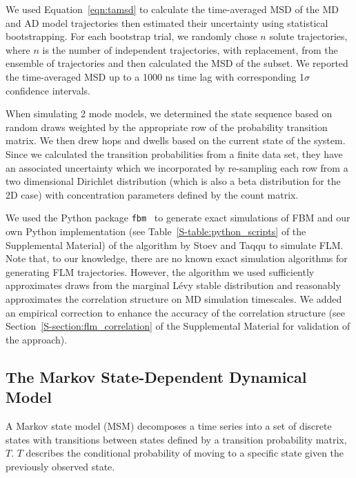 \documentclass[aps,pre,preprint,groupedaddress,longbibliography]{revtex4-2}
\begin{document}
  We used Equation~\ref{eqn:tamsd} to calculate the time-averaged MSD of the MD
  and AD model trajectories then estimated their uncertainty using statistical
  bootstrapping. For each bootstrap trial, we randomly chose $n$ solute
  trajectories, where $n$ is the number of independent trajectories, with
  replacement, from the ensemble of trajectories and then calculated the MSD of
  the subset. We reported the time-averaged MSD up to a 1000 ns time lag with
  corresponding 1$\sigma$ confidence intervals. 

  When simulating 2 mode models, we determined the state sequence based on
  random draws weighted by the appropriate row of the probability transition
  matrix. We then drew hops and dwells based on the current state of the
  system. Since we calculated the transition probabilities from a finite data
  set, they have an associated uncertainty which we incorporated by re-sampling
  each row from a two dimensional Dirichlet distribution (which is also a beta
  distribution for the 2D case) with concentration parameters defined by the
  count matrix.~\cite{bacallado_bayesian_2009}
  
  We used the Python package \texttt{fbm}~\cite{flynn_fbm_2019} to generate exact simulations of FBM
  and our own Python implementation (see Table~\ref{S-table:python_scripts} of
  the Supplemental Material) of the algorithm by Stoev and Taqqu to
  simulate FLM.~\cite{stoev_simulation_2004} Note that, to our knowledge, there
  are no known exact simulation algorithms for generating FLM trajectories.
  However, the algorithm we used sufficiently approximates draws from the
  marginal L\'evy stable distribution and reasonably approximates the
  correlation structure on MD simulation timescales. We added an empirical
  correction to enhance the accuracy of the correlation structure (see
  Section~\ref{S-section:flm_correlation} of the Supplemental Material for
  validation of the approach).

  \subsection{The Markov State-Dependent Dynamical Model}\label{method:MSMs}  

  A Markov state model (MSM) decomposes a time series into a set of discrete
  states with transitions between states defined by a transition probability
  matrix, $T$.  $T$ describes the conditional probability of moving to a
  specific state given the previously observed
  state.~\cite{pande_everything_2010,wehmeyer_introduction_2018}
\end{document}
